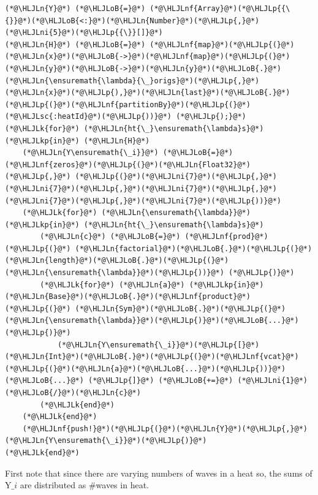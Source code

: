\documentclass[12pt,a4paper]{article}
\newcommand{\HLJLk}[1]{\textcolor[RGB]{148,91,176}{\textbf{#1}}}
\newcommand{\HLJLkp}[1]{\textcolor[RGB]{148,91,176}{\textbf{#1}}}
\newcommand{\HLJLn}[1]{#1}
\newcommand{\HLJLnf}[1]{\textcolor[RGB]{66,102,213}{#1}}
\newcommand{\HLJLsc}[1]{\textcolor[RGB]{201,61,57}{#1}}
\newcommand{\HLJLni}[1]{\textcolor[RGB]{59,151,46}{#1}}
\newcommand{\HLJLoB}[1]{\textcolor[RGB]{102,102,102}{\textbf{#1}}}
\newcommand{\HLJLp}[1]{#1}
\begin{document}
\begin{lstlisting}
(*@\HLJLn{Y}@*) (*@\HLJLoB{=}@*) (*@\HLJLnf{Array}@*)(*@\HLJLp{{\{}}@*)(*@\HLJLoB{<:}@*)(*@\HLJLn{Number}@*)(*@\HLJLp{,}@*)(*@\HLJLni{5}@*)(*@\HLJLp{{\}}[]}@*)
(*@\HLJLn{H}@*) (*@\HLJLoB{=}@*) (*@\HLJLnf{map}@*)(*@\HLJLp{(}@*)(*@\HLJLn{x}@*)(*@\HLJLoB{->}@*)(*@\HLJLnf{map}@*)(*@\HLJLp{(}@*)(*@\HLJLn{y}@*)(*@\HLJLoB{->}@*)(*@\HLJLn{y}@*)(*@\HLJLoB{.}@*)(*@\HLJLn{\ensuremath{\lambda}{\_}origs}@*)(*@\HLJLp{,}@*)(*@\HLJLn{x}@*)(*@\HLJLp{),}@*)(*@\HLJLn{last}@*)(*@\HLJLoB{.}@*)(*@\HLJLp{(}@*)(*@\HLJLnf{partitionBy}@*)(*@\HLJLp{(}@*)(*@\HLJLsc{:heatId}@*)(*@\HLJLp{))}@*) (*@\HLJLp{);}@*)
(*@\HLJLk{for}@*) (*@\HLJLn{ht{\_}\ensuremath{\lambda}s}@*) (*@\HLJLkp{in}@*) (*@\HLJLn{H}@*)
	(*@\HLJLn{Y\ensuremath{\_i}}@*) (*@\HLJLoB{=}@*) (*@\HLJLnf{zeros}@*)(*@\HLJLp{(}@*)(*@\HLJLn{Float32}@*)(*@\HLJLp{,}@*) (*@\HLJLp{(}@*)(*@\HLJLni{7}@*)(*@\HLJLp{,}@*)(*@\HLJLni{7}@*)(*@\HLJLp{,}@*)(*@\HLJLni{7}@*)(*@\HLJLp{,}@*)(*@\HLJLni{7}@*)(*@\HLJLp{,}@*)(*@\HLJLni{7}@*)(*@\HLJLp{))}@*)
	(*@\HLJLk{for}@*) (*@\HLJLn{\ensuremath{\lambda}}@*) (*@\HLJLkp{in}@*) (*@\HLJLn{ht{\_}\ensuremath{\lambda}s}@*)
		(*@\HLJLn{c}@*) (*@\HLJLoB{=}@*) (*@\HLJLnf{prod}@*)(*@\HLJLp{(}@*) (*@\HLJLn{factorial}@*)(*@\HLJLoB{.}@*)(*@\HLJLp{(}@*)(*@\HLJLn{length}@*)(*@\HLJLoB{.}@*)(*@\HLJLp{(}@*)(*@\HLJLn{\ensuremath{\lambda}}@*)(*@\HLJLp{))}@*) (*@\HLJLp{)}@*)
		(*@\HLJLk{for}@*) (*@\HLJLn{a}@*) (*@\HLJLkp{in}@*) (*@\HLJLn{Base}@*)(*@\HLJLoB{.}@*)(*@\HLJLnf{product}@*)(*@\HLJLp{(}@*) (*@\HLJLn{Sym}@*)(*@\HLJLoB{.}@*)(*@\HLJLp{(}@*)(*@\HLJLn{\ensuremath{\lambda}}@*)(*@\HLJLp{)}@*)(*@\HLJLoB{...}@*)(*@\HLJLp{)}@*)
			(*@\HLJLn{Y\ensuremath{\_i}}@*)(*@\HLJLp{[}@*) (*@\HLJLn{Int}@*)(*@\HLJLoB{.}@*)(*@\HLJLp{(}@*)(*@\HLJLnf{vcat}@*)(*@\HLJLp{(}@*)(*@\HLJLn{a}@*)(*@\HLJLoB{...}@*)(*@\HLJLp{))}@*)(*@\HLJLoB{...}@*) (*@\HLJLp{]}@*) (*@\HLJLoB{+=}@*) (*@\HLJLni{1}@*)(*@\HLJLoB{/}@*)(*@\HLJLn{c}@*)
		(*@\HLJLk{end}@*)
	(*@\HLJLk{end}@*)
	(*@\HLJLnf{push!}@*)(*@\HLJLp{(}@*)(*@\HLJLn{Y}@*)(*@\HLJLp{,}@*)(*@\HLJLn{Y\ensuremath{\_i}}@*)(*@\HLJLp{)}@*)
(*@\HLJLk{end}@*)
\end{lstlisting}


First note that since there are varying numbers of waves in a heat so, the sums of Y\ensuremath{\_i} are distributed as \#waves in heat.
\end{document}

